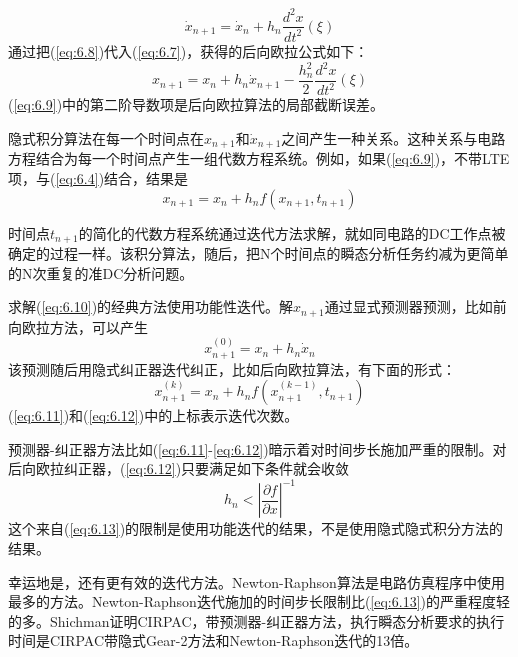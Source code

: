 \begin{equation}
    \dot{x}_{n+1} = \dot{x}_n + h_n \frac{d^2x}{dt^2}(\xi)
    \label{eq:6.8}
\end{equation}
通过把(\ref{eq:6.8})代入(\ref{eq:6.7})，获得的后向欧拉公式如下：
\begin{equation}
    x_{n+1} = x_n + h_n\dot{x}_{n+1} - \frac{h^2_n}{2}\frac{d^2x}{dt^2}(\xi)
    \label{eq:6.9}
\end{equation}
(\ref{eq:6.9})中的第二阶导数项是后向欧拉算法的局部截断误差。

隐式积分算法在每一个时间点在$x_{n+1}$和$\dot{x}_{n+1}$之间产生一种关系。这种关系与电路方程结合为每一个时间点产生一组代数方程系统。例如，如果(\ref{eq:6.9})，不带LTE项，与(\ref{eq:6.4})结合，结果是
\begin{equation}
    x_{n+1} = x_n + h_n f(x_{n+1},t_{n+1})
    \label{eq:6.10}
\end{equation}

时间点$t_{n+1}$的简化的代数方程系统通过迭代方法求解，就如同电路的DC工作点被确定的过程一样。该积分算法，随后，把N个时间点的瞬态分析任务约减为更简单的N次重复的准DC分析问题。

求解(\ref{eq:6.10})的经典方法使用功能性迭代\cite{ref-37}。解$x_{n+1}$通过显式预测器预测，比如前向欧拉方法，可以产生
\begin{equation}
    x^{(0)}_{n+1} = x_n + h_n \dot{x}_n
    \label{eq:6.11}
\end{equation}
该预测随后用隐式纠正器迭代纠正，比如后向欧拉算法，有下面的形式：
\begin{equation}
    x^{(k)}_{n+1} = x_n + h_n f(x^{(k-1)}_{n+1},t_{n+1})
    \label{eq:6.12}
\end{equation}
(\ref{eq:6.11})和(\ref{eq:6.12})中的上标表示迭代次数。

预测器-纠正器方法比如(\ref{eq:6.11}-\ref{eq:6.12})暗示着对时间步长施加严重的限制。对后向欧拉纠正器，(\ref{eq:6.12})只要满足如下条件就会收敛\cite{ref-37}
\begin{equation}
    h_n < |\frac{\partial f}{\partial x}|^{-1}
    \label{eq:6.13}
\end{equation}
这个来自(\ref{eq:6.13})的限制是使用功能迭代的结果，不是使用隐式隐式积分方法的结果。

幸运地是，还有更有效的迭代方法。Newton-Raphson算法是电路仿真程序中使用最多的方法。Newton-Raphson迭代施加的时间步长限制比(\ref{eq:6.13})的严重程度轻的多。Shichman\cite{ref-41}证明CIRPAC，带预测器-纠正器方法，执行瞬态分析要求的执行时间是CIRPAC带隐式Gear-2方法和Newton-Raphson迭代的13倍。

